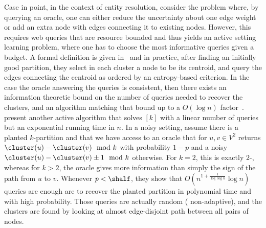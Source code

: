 
Case in point, in the context of entity resolution, \textcite{activeCoref07} consider the \pcc{}
problem where, by querying an oracle, one can either reduce the uncertainty about one edge weight or
add an extra node with edges connecting it to existing nodes. However, this requires web queries
that are resource bounded and thus yields an active setting learning problem, where one has to
choose the most informative
queries given a budget. A formal definition is given in~\autocite{queryMoreEdgeCC07} and in
practice, after finding an initially good partition, they select in each cluster a node to be its
centroid, and query the edges connecting the centroid as ordered by an entropy-based criterion.
In the case the oracle answering the queries is consistent, then there exists an information
theoretic bound on the number of queries needed to recover the clusters, and an algorithm matching
that bound up to a $O(\log n)$ factor~\autocite{perfectActiveLong17}.
\textcite[Section 5]{Ailon2014} present another active algorithm that solves \mind$[k]$ with a
linear number of queries but an exponential running time in $n$.  In a noisy setting,
\textcite{Mitzenmacher2016} assume there is a planted $k$-partition and that we have access to an
oracle that for $u,v\in V^2$ returns $\cluster(u) - \cluster(v) \mod k$ with probability $1-p$ and a
noisy $\cluster(u) - \cluster(v) \pm 1 \mod k$ otherwise. For $k=2$, this is exactly $2$-\pcc{},
whereas for $k>2$, the oracle gives more information than simply the sign of the path from $u$ to
$v$. Whenever
$p < \shalf$, they show that $O(n^{1+\frac{1}{\log\log n}}\log n)$ queries are enough are to recover
the planted partition in polynomial time and with high probability. Those queries are actually
random (\ie{} non-adaptive), and the clusters are found by looking at almost edge-disjoint path
between all pairs of nodes.

